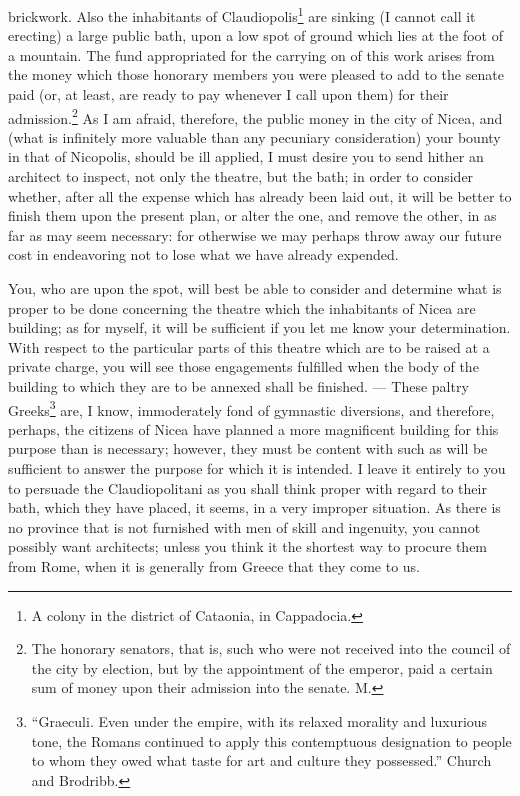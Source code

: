 brickwork. Also the inhabitants of Claudiopolis\footnote{A colony in the
district of Cataonia, in Cappadocia.} are sinking (I
cannot call it erecting) a large public bath, upon a low spot of ground
which lies at the foot of a mountain. The fund appropriated for the
carrying on of this work arises from the money which those honorary
members you were pleased to add to the senate paid (or, at least, are
ready to pay whenever I call upon them) for their admission.\footnote{The honorary
senators, that is, such who were not received into the council of the city
by election, but by the appointment of the emperor, paid a certain sum of
money upon their admission into the senate. M.}
As I am afraid, therefore, the public money in the city of Nicea, and
(what is infinitely more valuable than any pecuniary consideration) your
bounty in that of Nicopolis, should be ill applied, I must desire you to
send hither an architect to inspect, not only the theatre, but the bath;
in order to consider whether, after all the expense which has already been
laid out, it will be better to finish them upon the present plan, or alter
the one, and remove the other, in as far as may seem necessary: for
otherwise we may perhaps throw away our future cost in endeavoring not to
lose what we have already expended.


You, who are upon the spot, will best be able to consider and determine
what is proper to be done concerning the theatre which the inhabitants of
Nicea are building; as for myself, it will be sufficient if you let me
know your determination. With respect to the particular parts of this
theatre which are to be raised at a private charge, you will see those
engagements fulfilled when the body of the building to which they are to
be annexed shall be finished. — These paltry Greeks\footnote{``Graeculi. Even under
the empire, with its relaxed morality and luxurious tone, the Romans
continued to apply this contemptuous designation to people to whom they
owed what taste for art and culture they possessed.'' Church and Brodribb.}
are, I know, immoderately fond of gymnastic diversions, and therefore,
perhaps, the citizens of Nicea have planned a more magnificent building
for this purpose than is necessary; however, they must be content with
such as will be sufficient to answer the purpose for which it is intended.
I leave it entirely to you to persuade the Claudiopolitani as you shall
think proper with regard to their bath, which they have placed, it seems,
in a very improper situation. As there is no province that is not
furnished with men of skill and ingenuity, you cannot possibly want
architects; unless you think it the shortest way to procure them from
Rome, when it is generally from Greece that they come to us.

